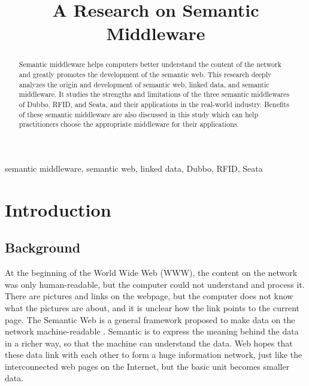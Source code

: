 \documentclass[conference]{IEEEtran}
\begin{document}
\title{A Research on Semantic Middleware\\

}

\author{
}

\maketitle

\begin{abstract}
Semantic middleware helps computers better understand the content of the network and greatly promotes the development of the semantic web. This research deeply analyzes the origin and development of semantic web, linked data, and semantic middleware.  It studies the strengths and limitations of the three semantic middlewares of Dubbo, RFID, and Seata, and their applications in the real-world industry. Benefits of these semantic middleware are also discussed in this study which can help practitioners choose the appropriate middleware for their applications.

\end{abstract}

\begin{IEEEkeywords}
semantic middleware, semantic web, linked data, Dubbo, RFID, Seata
\end{IEEEkeywords}

\section{Introduction}
\subsection{Background}

At the beginning of the World Wide Web (WWW), the content on the network was only human-readable, but the computer could not understand and process it. There are pictures and links on the webpage, but the computer does not know what the pictures are about, and it is unclear how the link points to the current page. The Semantic Web is a general framework proposed to make data on the network machine-readable \cite{b1}. Semantic is to express the meaning behind the data in a richer way, so that the machine can understand the data. Web hopes that these data link with each other to form a huge information network, just like the interconnected web pages on the Internet, but the basic unit becomes smaller data.
\end{document}
